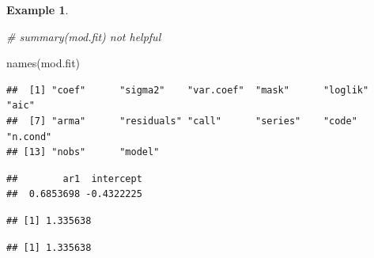 \documentclass[
]{book}
\newenvironment{Shaded}{\begin{snugshade}}{\end{snugshade}}
\newcommand{\CommentTok}[1]{\textcolor[rgb]{0.56,0.35,0.01}{\textit{#1}}}
\newcommand{\FunctionTok}[1]{\textcolor[rgb]{0.00,0.00,0.00}{#1}}
\newcommand{\NormalTok}[1]{#1}
\newcommand{\SpecialCharTok}[1]{\textcolor[rgb]{0.00,0.00,0.00}{#1}}
\theoremstyle{definition}
\theoremstyle{definition}
\newtheorem{example}{Example}[chapter]
\theoremstyle{definition}
\theoremstyle{definition}
\theoremstyle{remark}
\begin{document}
\begin{example}
\begin{Shaded}
\begin{Highlighting}[]
\CommentTok{\# summary(mod.fit) not helpful}
\end{Highlighting}
\end{Shaded}

\begin{Shaded}
\begin{Highlighting}[]
\FunctionTok{names}\NormalTok{(mod.fit)}
\end{Highlighting}
\end{Shaded}

\begin{verbatim}
##  [1] "coef"      "sigma2"    "var.coef"  "mask"      "loglik"    "aic"      
##  [7] "arma"      "residuals" "call"      "series"    "code"      "n.cond"   
## [13] "nobs"      "model"
\end{verbatim}

\begin{Shaded}
\end{Shaded}

\begin{verbatim}
##        ar1  intercept 
##  0.6853698 -0.4322225
\end{verbatim}

\begin{Shaded}
\end{Shaded}

\begin{verbatim}
## [1] 1.335638
\end{verbatim}

\begin{Shaded}
\end{Shaded}

\begin{verbatim}
## [1] 1.335638
\end{verbatim}

\begin{Shaded}
\end{Shaded}


\end{example}
\end{document}
